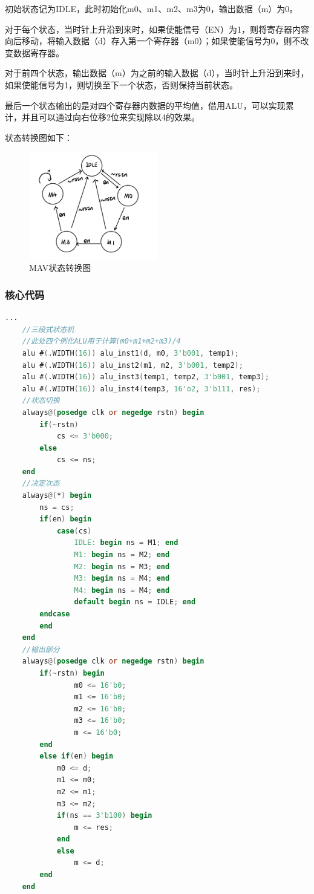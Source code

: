 \documentclass[a4paper]{article}
\begin{document}
初始状态记为IDLE，此时初始化m0、m1、m2、m3为0，输出数据（m）为0。

对于每个状态，当时针上升沿到来时，如果使能信号（EN）为1，则将寄存器内容向后移动，将输入数据（d）存入第一个寄存器（m0）；如果使能信号为0，则不改变数据寄存器。

对于前四个状态，输出数据（m）为之前的输入数据（d），当时针上升沿到来时，如果使能信号为1，则切换至下一个状态，否则保持当前状态。

最后一个状态输出的是对四个寄存器内数据的平均值，借用ALU，可以实现累计，并且可以通过向右位移2位来实现除以4的效果。

状态转换图如下：

\begin{figure}[H]
  \centering
  \includegraphics[width=0.5\textwidth]{mav_graph.jpeg}
  \caption{MAV状态转换图}
  \label{fig:mav_g}
\end{figure}
\subsubsection{核心代码}
\begin{lstlisting}[language={verilog},title={mav.v}]
    ...
    //三段式状态机
    //此处四个例化ALU用于计算(m0+m1+m2+m3)/4
    alu #(.WIDTH(16)) alu_inst1(d, m0, 3'b001, temp1);
    alu #(.WIDTH(16)) alu_inst2(m1, m2, 3'b001, temp2);
    alu #(.WIDTH(16)) alu_inst3(temp1, temp2, 3'b001, temp3);
    alu #(.WIDTH(16)) alu_inst4(temp3, 16'o2, 3'b111, res);
    //状态切换
    always@(posedge clk or negedge rstn) begin
        if(~rstn)
            cs <= 3'b000;
        else
            cs <= ns;
    end
    //决定次态
    always@(*) begin
        ns = cs;
        if(en) begin
            case(cs)
                IDLE: begin ns = M1; end
                M1: begin ns = M2; end
                M2: begin ns = M3; end
                M3: begin ns = M4; end
                M4: begin ns = M4; end
                default begin ns = IDLE; end
        endcase
        end
    end
    //输出部分
    always@(posedge clk or negedge rstn) begin
        if(~rstn) begin
                m0 <= 16'b0;
                m1 <= 16'b0;
                m2 <= 16'b0;
                m3 <= 16'b0;
                m <= 16'b0;
        end
        else if(en) begin
            m0 <= d;
            m1 <= m0;
            m2 <= m1;
            m3 <= m2;
            if(ns == 3'b100) begin
                m <= res;
            end
            else
                m <= d;
        end
    end
\end{lstlisting}
\end{document}
